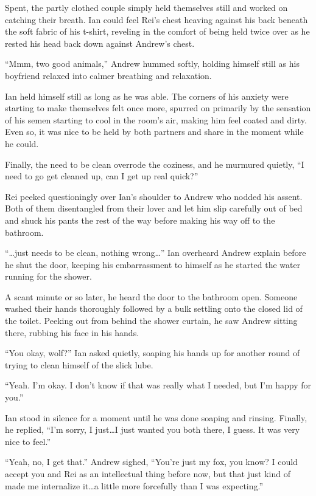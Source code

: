 Spent, the partly clothed couple simply held themselves still and worked on catching their breath. Ian could feel Rei's chest heaving against his back beneath the soft fabric of his t-shirt, reveling in the comfort of being held twice over as he rested his head back down against Andrew's chest.

``Mmm, two good animals,'' Andrew hummed softly, holding himself still as his boyfriend relaxed into calmer breathing and relaxation.

Ian held himself still as long as he was able. The corners of his anxiety were starting to make themselves felt once more, spurred on primarily by the sensation of his semen starting to cool in the room's air, making him feel coated and dirty. Even so, it was nice to be held by both partners and share in the moment while he could.

Finally, the need to be clean overrode the coziness, and he murmured quietly, ``I need to go get cleaned up, can I get up real quick?''

Rei peeked questioningly over Ian's shoulder to Andrew who nodded his assent. Both of them disentangled from their lover and let him slip carefully out of bed and shuck his pants the rest of the way before making his way off to the bathroom.

``\ldots{}just needs to be clean, nothing wrong\ldots{}'' Ian overheard Andrew explain before he shut the door, keeping his embarrassment to himself as he started the water running for the shower.

A scant minute or so later, he heard the door to the bathroom open. Someone washed their hands thoroughly followed by a bulk settling onto the closed lid of the toilet. Peeking out from behind the shower curtain, he saw Andrew sitting there, rubbing his face in his hands.

``You okay, wolf?'' Ian asked quietly, soaping his hands up for another round of trying to clean himself of the slick lube.

``Yeah. I'm okay. I don't know if that was really what I needed, but I'm happy for you.''

Ian stood in silence for a moment until he was done soaping and rinsing. Finally, he replied, ``I'm sorry, I just\ldots{}I just wanted you both there, I guess. It was very nice to feel.''

``Yeah, no, I get that.'' Andrew sighed, ``You're just my fox, you know? I could accept you and Rei as an intellectual thing before now, but that just kind of made me internalize it\ldots{}a little more forcefully than I was expecting.''

